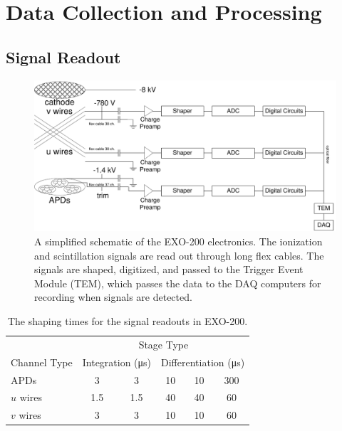 \documentclass[herrin-thesis.tex]{subfiles}
\begin{document}
\chapter{Data Collection and Processing}
\label{ch:data}

\section{Signal Readout}
\begin{figure}
\centering
\includegraphics[width=\textwidth]{./figures/data_simplified_electronics.pdf}
\caption[The EXO-200 electronics]{A simplified schematic of the EXO-200 electronics. The ionization and scintillation signals are read out through long flex cables. The signals are shaped, digitized, and passed to the Trigger Event Module (TEM), which passes the data to the DAQ computers for recording when signals are detected.}
\label{fig:data_simplified_electronics}
\end{figure}

\begin{table}[tbp]
\centering
\caption[Electronic shaping times]{The shaping times for the signal readouts in EXO-200.}
\label{tab:data_shaping_times}
\begin{tabular}{l c c c c c}\toprule
				&						\multicolumn{5}{c}{Stage Type}										\\\cmidrule{2-6}
	Channel Type	&	\multicolumn{2}{c}{Integration (\si{\micro\s})}	&	\multicolumn{3}{c}{Differentiation (\si{\micro\s})}	\\\midrule
	APDs		&	3		&	3						&	10		&	10	&	300					\\
	\(u\) wires		&	1.5		&	1.5						&	40		&	40	&	60					\\
	\(v\) wires		&	3		&	3						&	10		&	10	&	60					\\\bottomrule
\end{tabular}
\end{table}
\end{document}
